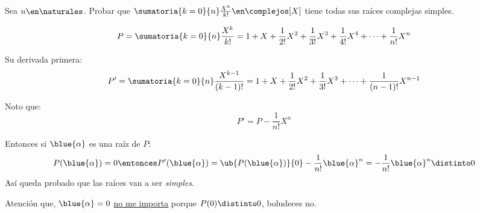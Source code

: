 \begin{enunciado}{\ejercicio}
  Sea $n \en \naturales$.
  Probar que $\sumatoria{k=0}{n}\frac{X^k}{k!} \en \complejos[X]$ tiene todas sus raíces complejas simples.
\end{enunciado}

$$
  P = \sumatoria{k=0}{n}\frac{X^k}{k!} =
  1 + X + \frac{1}{2!}X^2 + \frac{1}{3!}X^3 + \frac{1}{4!}X^4 + \cdots + \frac{1}{n!}X^n
$$

Su derivada primera:
$$
  P' = \sumatoria{k=0}{n}\frac{X^{k-1}}{(k-1)!} =
  1 + X + \frac{1}{2!}X^2 + \frac{1}{3!}X^3 + \cdots + \frac{1}{(n-1)!}X^{n-1}
$$

Noto que:
$$
  P' = P - \frac{1}{n!}X^n
$$

Entonces si $\blue{\alpha}$ es una raíz de $P$:
$$
  P(\blue{\alpha}) = 0
  \entonces
  P'(\blue{\alpha}) =
  \ub{P(\blue{\alpha})}{0} - \frac{1}{n!}\blue{\alpha}^n = - \frac{1}{n!}\blue{\alpha}^n \distinto 0
$$
Así queda probado que las raíces van a ser \textit{simples}.

Atención que, $\blue{\alpha} = 0$ \underline{no me importa} porque $P(0) \distinto 0$, boludeces no.

\begin{aportes}
  \item {}
\end{aportes}
